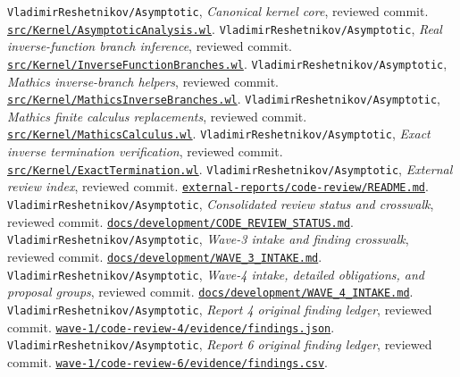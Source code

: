 \documentclass[11pt,letterpaper]{article}
\newcommand{\code}[1]{\nolinkurl{#1}}
\newcommand{\repo}{\texttt{VladimirReshetnikov/Asymptotic}}
\newcommand{\source}[2]{\href{https://github.com/VladimirReshetnikov/Asymptotic/blob/8e859961d7d37f008b826f3a8cad406460271614/#1}{#2}}
\begin{document}
\clearpage
\begin{thebibliography}{99}
\small
{} \repo, \emph{Canonical kernel core}, reviewed commit.\newline
\source{src/Kernel/AsymptoticAnalysis.wl}{\code{src/Kernel/AsymptoticAnalysis.wl}}.
 \repo, \emph{Real inverse-function branch inference}, reviewed commit.\newline
\source{src/Kernel/InverseFunctionBranches.wl}{\code{src/Kernel/InverseFunctionBranches.wl}}.
 \repo, \emph{Mathics inverse-branch helpers}, reviewed commit.\newline
\source{src/Kernel/MathicsInverseBranches.wl}{\code{src/Kernel/MathicsInverseBranches.wl}}.
 \repo, \emph{Mathics finite calculus replacements}, reviewed commit.\newline
\source{src/Kernel/MathicsCalculus.wl}{\code{src/Kernel/MathicsCalculus.wl}}.
 \repo, \emph{Exact inverse termination verification}, reviewed commit.\newline
\source{src/Kernel/ExactTermination.wl}{\code{src/Kernel/ExactTermination.wl}}.
 \repo, \emph{External review index}, reviewed commit.\newline
\source{external-reports/code-review/README.md}{\code{external-reports/code-review/README.md}}.
 \repo, \emph{Consolidated review status and crosswalk}, reviewed commit.\newline
\source{docs/development/CODE_REVIEW_STATUS.md}{\code{docs/development/CODE_REVIEW_STATUS.md}}.
 \repo, \emph{Wave-3 intake and finding crosswalk}, reviewed commit.\newline
\source{docs/development/WAVE_3_INTAKE.md}{\code{docs/development/WAVE_3_INTAKE.md}}.
 \repo, \emph{Wave-4 intake, detailed obligations, and proposal groups}, reviewed commit.\newline
\source{docs/development/WAVE_4_INTAKE.md}{\code{docs/development/WAVE_4_INTAKE.md}}.
 \repo, \emph{Report 4 original finding ledger}, reviewed commit.\newline
\source{external-reports/code-review/wave-1/code-review-4/evidence/findings.json}{\code{wave-1/code-review-4/evidence/findings.json}}.
 \repo, \emph{Report 6 original finding ledger}, reviewed commit.\newline
\source{external-reports/code-review/wave-1/code-review-6/evidence/findings.csv}{\code{wave-1/code-review-6/evidence/findings.csv}}.

\end{thebibliography}
\end{document}
